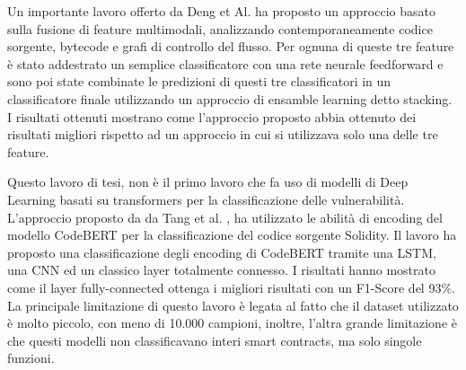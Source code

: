 \documentclass[../../Thesis.tex]{subfiles}
\begin{document}
Un importante lavoro offerto da Deng et Al. \cite{Deng} ha proposto un approccio basato sulla fusione di feature multimodali, analizzando contemporaneamente codice sorgente, bytecode e grafi di controllo del flusso. Per ognuna di queste tre feature \`e stato addestrato un semplice classificatore con una rete neurale feedforward e sono poi state combinate le predizioni di questi tre classificatori in un classificatore finale utilizzando un approccio di ensamble learning detto stacking. I risultati ottenuti mostrano come l'approccio proposto abbia ottenuto dei risultati migliori rispetto ad un approccio in cui si utilizzava solo una delle tre feature.

Questo lavoro di tesi, non \`e il primo lavoro che fa uso di modelli di Deep Learning basati su transformers per la classificazione delle vulnerabilit\`a. L'approccio proposto da da Tang et al. \cite{CodeBERTPaper}, ha utilizzato le abilit\`a di encoding del modello CodeBERT per la classificazione del codice sorgente Solidity. Il lavoro ha proposto una classificazione degli encoding di CodeBERT tramite una LSTM, una CNN ed un classico layer totalmente connesso. I risultati hanno mostrato come il layer fully-connected ottenga i migliori risultati con un F1-Score del 93\%. La principale limitazione di questo lavoro \`e legata al fatto che il dataset utilizzato \`e molto piccolo, con meno di 10.000 campioni, inoltre, l'altra grande limitazione \`e che questi modelli non classificavano interi smart contracts, ma solo singole funzioni.
\end{document}
